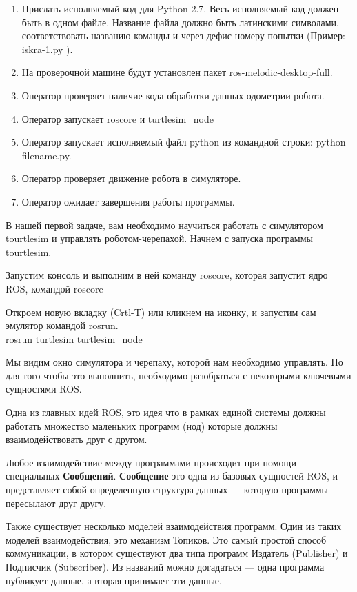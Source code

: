 \begin{enumerate}
    \item Прислать исполняемый код для Python 2.7. Весь исполняемый код должен быть в одном файле. Название файла должно быть латинскими символами, соответствовать названию команды и через дефис номеру попытки (Пример:  iskra-1.py ).
    \item На проверочной машине будут установлен пакет ros-melodic-desktop-full.
    \item Оператор проверяет наличие кода обработки данных одометрии робота.
    \item Оператор запускает roscore и turtlesim\_node
    \item Оператор запускает исполняемый файл python из командной строки: python filename.py.
    \item Оператор проверяет движение робота в симуляторе.
    \item Оператор ожидает завершения работы программы.
\end{enumerate}

\solutionSection

В нашей первой задаче, вам необходимо научиться работать с симулятором tourtlesim и управлять роботом-черепахой. Начнем с запуска программы tourtlesim.

Запустим консоль и выполним в ней команду roscore, которая запустит ядро ROS, командой roscore

Откроем новую вкладку (Crtl-T) или кликнем на иконку, и запустим сам эмулятор командой rosrun.\\
rosrun turtlesim turtlesim\_node

Мы видим окно симулятора и черепаху, которой нам необходимо управлять. Но для того чтобы это выполнить, необходимо разобраться с некоторыми ключевыми сущностями ROS.

Одна из главных идей ROS, это идея что в рамках единой системы должны работать множество маленьких программ (нод) которые должны взаимодействовать друг с другом.

Любое взаимодействие между программами происходит при помощи специальных \textbf{Сообщений}. \textbf{Сообщение} это одна из базовых сущностей ROS, и представляет собой определенную структура данных — которую программы пересылают друг другу.

Также существует несколько моделей взаимодействия программ. Один из таких моделей взаимодействия, это механизм Топиков. Это самый простой способ коммуникации, в котором существуют два типа программ Издатель (Publisher) и Подписчик (Subscriber). Из названий можно догадаться — одна программа публикует данные, а вторая принимает эти данные.

